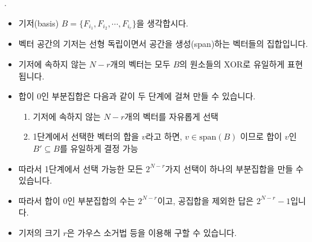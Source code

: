 \begin{frame}{\probno{}. }
    \begin{itemize}
        \item 기저(basis) $B = \lbrace F_{i_1}, F_{i_2}, \cdots, F_{i_r} \rbrace$을 생각합시다.
        \item 벡터 공간의 기저는 선형 독립이면서 공간을 생성(span)하는 벡터들의 집합입니다.
        \item 기저에 속하지 않는 $N-r$개의 벡터는 모두 $B$의 원소들의 XOR로 유일하게 표현됩니다.
        \item 합이 0인 부분집합은 다음과 같이 두 단계에 걸쳐 만들 수 있습니다.
        \begin{enumerate}
            \item 기저에 속하지 않는 $N-r$개의 벡터를 자유롭게 선택
            \item 1단계에서 선택한 벡터의 합을 $v$라고 하면, $v \in \text{span}(B)$ 이므로 합이 $v$인 $B' \subseteq B$를 유일하게 결정 가능
        \end{enumerate}
        \item 따라서 1단계에서 선택 가능한 모든 $2^{N-r}$가지 선택이 하나의 부분집합을 만들 수 있습니다.
        \item 따라서 합이 0인 부분집합의 수는 $2^{N-r}$이고, 공집합을 제외한 답은 $2^{N-r}-1$입니다.
        \item 기저의 크기 $r$은 가우스 소거법 등을 이용해 구할 수 있습니다.
    \end{itemize}
\end{frame}